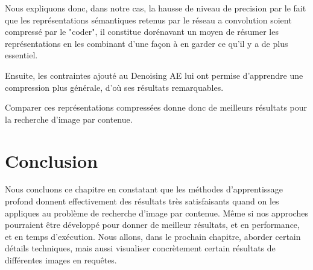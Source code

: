 Nous expliquons donc, dans notre cas, la hausse de niveau de precision par le fait que les représentations sémantiques retenus par le réseau a convolution soient compressé par le "coder", il constitue dorénavant un moyen de résumer les représentations en les combinant d'une façon à en garder ce qu'il y a de plus essentiel.

Ensuite, les contraintes ajouté au Denoising AE lui ont permise d'apprendre une compression plus générale, d’où ses résultats remarquables.

Comparer ces représentations compressées donne donc de meilleurs résultats pour la recherche d'image par contenue.


\section{Conclusion}

Nous concluons ce chapitre en constatant que les méthodes d'apprentissage profond donnent effectivement des résultats très satisfaisants quand on les appliques au problème de recherche d'image par contenue. Même si nos approches pourraient être développé pour donner de meilleur résultats, et en performance, et en temps d’exécution. Nous allons, dans le prochain chapitre, aborder certain détails techniques, mais aussi visualiser concrètement certain résultats de différentes images en requêtes.